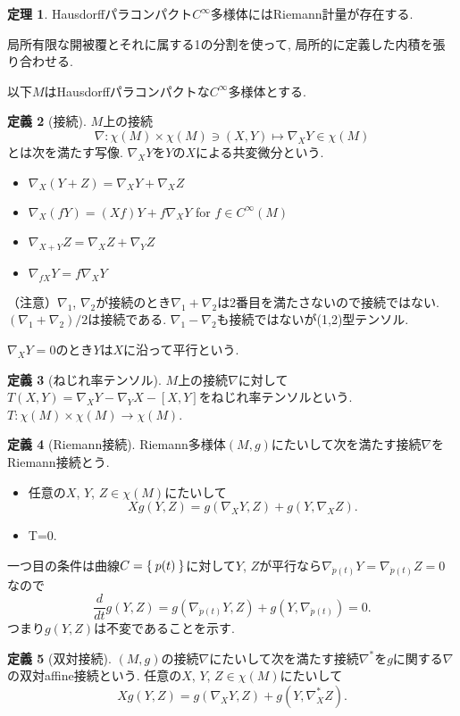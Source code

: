 \documentclass{jsarticle}
\newcommand{\con}{\nabla}
\newcommand{\dcon}{\con^{*}}
\theoremstyle{definition}
\newtheorem{theorem}{定理}
\newtheorem{definition}[theorem]{定義}
\numberwithin{theorem}{section}
\begin{document}
\begin{theorem}
Hausdorffパラコンパクト$C^\infty$多様体にはRiemann計量が存在する.
\end{theorem}
局所有限な開被覆とそれに属する1の分割を使って, 局所的に定義した内積を張り合わせる.


以下$M$はHausdorffパラコンパクトな$C^\infty$多様体とする.

\begin{definition}[接続]
$M$上の接続
\[
\con:\chi(M) \times \chi(M)\ni (X,Y)\mapsto \con_X Y \in \chi(M)
\]
とは次を満たす写像. $\con_X Y$を$Y$の$X$による共変微分という.
\begin{itemize}
\item[1.] $\con_X(Y+Z)=\con_X Y + \con_X Z$
\item[2.] $\con_X(fY)=(Xf)Y+f\con_X Y$ for $f \in C^\infty(M)$
\item[3.] $\con_{X+Y}Z=\con_X Z+\con_Y Z$
\item[4.] $\con_{fX}Y=f\con_X Y$
\end{itemize}
\end{definition}
（注意）$\con_1$, $\con_2$が接続のとき$\con_1+\con_2$は2番目を満たさないので接続ではない.
$(\con_1+\con_2)/2$は接続である. $\con_1-\con_2$も接続ではないが(1,2)型テンソル.

$\con_X Y=0$のとき$Y$は$X$に沿って平行という.

\begin{definition}[ねじれ率テンソル]
$M$上の接続$\con$に対して$T(X,Y)=\con_X Y-\con_Y X-[X,Y]$をねじれ率テンソルという. $T:\chi(M) \times \chi(M) \rightarrow \chi(M)$.
\end{definition}

\begin{definition}[Riemann接続]
Riemann多様体$(M,g)$にたいして次を満たす接続$\con$をRiemann接続とう.
\begin{itemize}
\item[計量的] 任意の$X$, $Y$, $Z \in \chi(M)$にたいして
\[
Xg(Y,Z)=g(\con_X Y,Z)+g(Y,\con_X Z).
\]
\item[対称的] T=0.
\end{itemize}
\end{definition}
一つ目の条件は曲線$C=\Set{p(t)}$に対して$Y$, $Z$が平行なら$\con_{\dot{p}(t)} Y=\con_{\dot{p}(t)} Z=0$なので
\[
\frac{d}{dt}g(Y,Z)=g(\con_{\dot{p}(t)} Y,Z)+g(Y,\con_{\dot{p}(t)})=0.
\]
つまり$g(Y,Z)$は不変であることを示す.

\begin{definition}[双対接続]
$(M,g)$の接続$\con$にたいして次を満たす接続$\dcon$を$g$に関する$\con$の双対affine接続という.
任意の$X$, $Y$, $Z \in \chi(M)$にたいして
\[
Xg(Y,Z)=g(\con_X Y,Z)+g(Y,\dcon_X Z).
\]
\end{definition}
\end{document}
